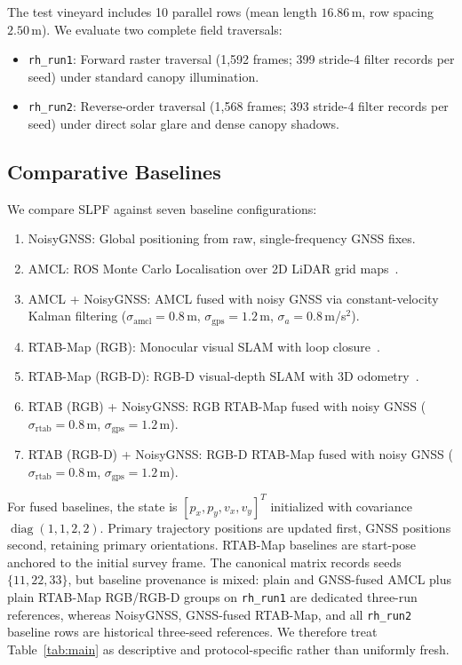 \documentclass[letterpaper, 10 pt, conference]{ieeeconf}
\begin{document}
The test vineyard includes 10 parallel rows (mean length $16.86\,$m, row spacing $2.50\,$m). We evaluate two complete field traversals:
\begin{itemize}
  \item \texttt{rh\_run1}: Forward raster traversal (1,592 frames; 399 stride-4 filter records per seed) under standard canopy illumination.
  \item \texttt{rh\_run2}: Reverse-order traversal (1,568 frames; 393 stride-4 filter records per seed) under direct solar glare and dense canopy shadows.
\end{itemize}

\subsection{Comparative Baselines}
We compare SLPF against seven baseline configurations:
\begin{enumerate}
  \item NoisyGNSS: Global positioning from raw, single-frequency GNSS fixes.
  \item AMCL: ROS Monte Carlo Localisation over 2D LiDAR grid maps~\cite{amcl}.
  \item AMCL + NoisyGNSS: AMCL fused with noisy GNSS via constant-velocity Kalman filtering ($\sigma_{\text{amcl}}=0.8\,$m, $\sigma_{\text{gps}}=1.2\,$m, $\sigma_a=0.8\,$m/s$^2$).
  \item RTAB-Map (RGB): Monocular visual SLAM with loop closure~\cite{rtabmap}.
  \item RTAB-Map (RGB-D): RGB-D visual-depth SLAM with 3D odometry~\cite{rtabmap}.
  \item RTAB (RGB) + NoisyGNSS: RGB RTAB-Map fused with noisy GNSS ($\sigma_{\text{rtab}}=0.8\,$m, $\sigma_{\text{gps}}=1.2\,$m).
  \item RTAB (RGB-D) + NoisyGNSS: RGB-D RTAB-Map fused with noisy GNSS ($\sigma_{\text{rtab}}=0.8\,$m, $\sigma_{\text{gps}}=1.2\,$m).
\end{enumerate}
For fused baselines, the state is $[p_x,p_y,v_x,v_y]^T$ initialized with covariance $\operatorname{diag}(1,1,2,2)$. Primary trajectory positions are updated first, GNSS positions second, retaining primary orientations. RTAB-Map baselines are start-pose anchored to the initial survey frame. The canonical matrix records seeds $\{11,22,33\}$, but baseline provenance is mixed: plain and GNSS-fused AMCL plus plain RTAB-Map RGB/RGB-D groups on \texttt{rh\_run1} are dedicated three-run references, whereas NoisyGNSS, GNSS-fused RTAB-Map, and all \texttt{rh\_run2} baseline rows are historical three-seed references. We therefore treat Table~\ref{tab:main} as descriptive and protocol-specific rather than uniformly fresh.
\end{document}
